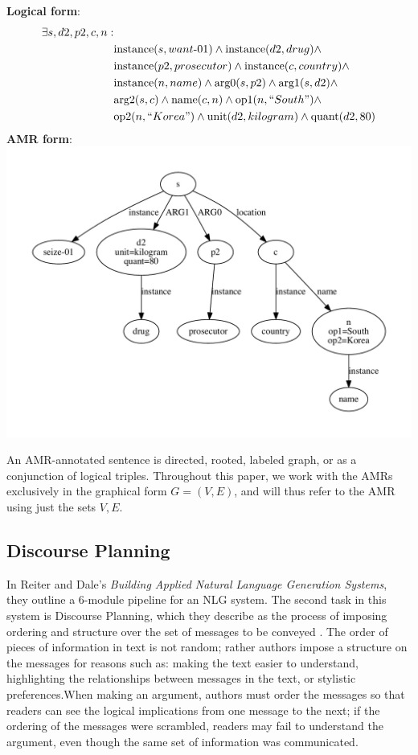 \documentclass[12pt]{article}
\begin{document}
\noindent \textbf{Logical form}:
\begin{equation}
\begin{split}
\exists s,d2,p2,c,n: &\\
&\text{instance}(s,want\text{-}01) \wedge \text{instance}(d2, drug) \wedge \\
&\text{instance}(p2, prosecutor) \wedge \text{instance}(c, country) \wedge \\
&\text{instance}(n, name) \wedge \text{arg0}(s,p2) \wedge \text{arg1}(s,d2)
\wedge \\ &\text{arg2}(s,c) \wedge \text{name}(c,n) \wedge \text{op1}(n,
``South") \wedge \\ &\text{op2}(n, ``Korea") \wedge \text{unit}(d2, kilogram)
\wedge \text{quant}(d2, 80)
\end{split}
\end{equation}
\textbf{AMR form}:\\
\includegraphics[width=\linewidth]{amr_example.pdf}

An AMR-annotated sentence is directed, rooted, labeled graph, or as a
conjunction of logical triples. Throughout this paper, we work with the AMRs
exclusively in the graphical form $G=(V,E)$, and will thus refer to the AMR
using just the sets $V,E$.

\subsection{Discourse Planning}

In Reiter and Dale's {\em Building Applied Natural Language Generation Systems}, they outline a 6-module pipeline for an NLG system. The second task in this system is Discourse Planning, which they describe as the process of imposing ordering and structure over the set of messages to be conveyed \cite{applied_nlg}. The order of pieces of information in text is not random; rather authors impose a structure on the messages for reasons such as: making the text easier to understand, highlighting the relationships between messages in the text, or stylistic preferences.When making an argument, authors must order the messages so that readers can see the logical implications from one message to the next; if the ordering of the messages were scrambled, readers may fail to understand the argument, even though the same set of information was communicated.
\end{document}
